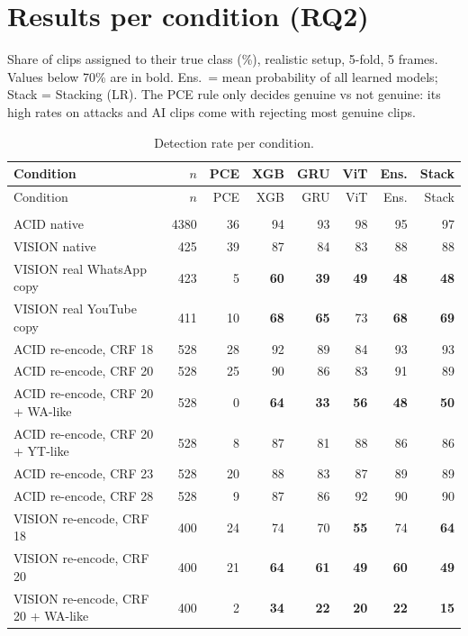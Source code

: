 \documentclass[11pt,a4paper]{article}
\begin{document}
\section{Results per condition (RQ2)}
Share of clips assigned to their true class (\%), realistic setup, 5-fold, 5 frames. Values below 70\% are in bold. Ens.\ = mean probability of all learned models; Stack = Stacking (LR). The PCE rule only decides genuine vs not genuine: its high rates on attacks and AI clips come with rejecting most genuine clips.
{\small\setlength{\tabcolsep}{4pt}\begin{longtable}{p{7.0cm}rrrrrrr}
\caption{Detection rate per condition.}\label{tab:cond}\\\toprule Condition & $n$ & PCE & XGB & GRU & ViT & Ens. & Stack \\\endfirsthead\toprule Condition & $n$ & PCE & XGB & GRU & ViT & Ens. & Stack \\\endhead\bottomrule\endfoot
\midrule\multicolumn{8}{l}{\textbf{Genuine (organic)}} \\
ACID native & 4380 & 36 & 94 & 93 & 98 & 95 & 97 \\
VISION native & 425 & 39 & 87 & 84 & 83 & 88 & 88 \\
VISION real WhatsApp copy & 423 & 5 & \textbf{60} & \textbf{39} & \textbf{49} & \textbf{48} & \textbf{48} \\
VISION real YouTube copy & 411 & 10 & \textbf{68} & \textbf{65} & 73 & \textbf{68} & \textbf{69} \\
ACID re-encode, CRF 18 & 528 & 28 & 92 & 89 & 84 & 93 & 93 \\
ACID re-encode, CRF 20 & 528 & 25 & 90 & 86 & 83 & 91 & 89 \\
ACID re-encode, CRF 20 + WA-like & 528 & 0 & \textbf{64} & \textbf{33} & \textbf{56} & \textbf{48} & \textbf{50} \\
ACID re-encode, CRF 20 + YT-like & 528 & 8 & 87 & 81 & 88 & 86 & 86 \\
ACID re-encode, CRF 23 & 528 & 20 & 88 & 83 & 87 & 89 & 89 \\
ACID re-encode, CRF 28 & 528 & 9 & 87 & 86 & 92 & 90 & 90 \\
VISION re-encode, CRF 18 & 400 & 24 & 74 & 70 & \textbf{55} & 74 & \textbf{64} \\
VISION re-encode, CRF 20 & 400 & 21 & \textbf{64} & \textbf{61} & \textbf{49} & \textbf{60} & \textbf{49} \\
VISION re-encode, CRF 20 + WA-like & 400 & 2 & \textbf{34} & \textbf{22} & \textbf{20} & \textbf{22} & \textbf{15} \\

\end{longtable}}
\end{document}
